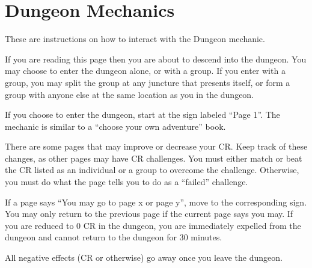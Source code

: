 \documentclass[green]{guildcamp2}
\begin{document}
\name{\gDungeonDirections{}}

\section{Dungeon Mechanics}
These are instructions on how to interact with the Dungeon mechanic.

\begin{enum}[Directions]
	\item If you are reading this page then you are about to descend into the dungeon. You may choose to enter the dungeon alone, or with a group. If you enter with a group, you may split the group at any juncture that presents itself, or form a group with anyone else at the same location as you in the dungeon.
	\item If you choose to enter the dungeon, start at the sign labeled ``Page 1''. The mechanic is similar to a ``choose your own adventure'' book. 
	\item There are some pages that may improve or decrease your CR. Keep track of these changes, as other pages may have  CR challenges. You must either match or beat the CR listed as an individual or a group to overcome the challenge. Otherwise, you must do what the page tells you to do as a ``failed'' challenge. 
	\item If a page says ``You may go to page x or page y'', move to the corresponding sign. You may only return to the previous page if the current page says you may. If you are reduced to 0 CR in the dungeon, you are immediately expelled from the dungeon and cannot return to the dungeon for 30 minutes. 
	\item All negative effects (CR or otherwise) go away once you leave the dungeon.
\end{enum}
	
\end{document}
